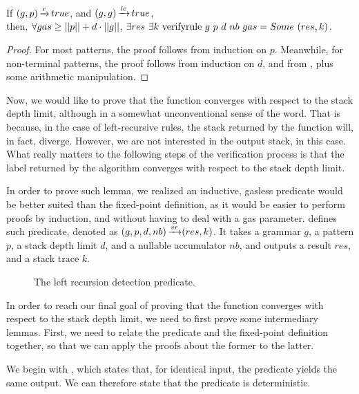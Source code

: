 \begin{lemma}%
    If $(g,p) \operatorname{\xrightarrow{\mathit{c}}} true$,
    and $(g,g) \operatorname{\xrightarrow{\mathit{lc}}} true$, \\
    then, $\forall gas \ge ||p|| + d \cdot ||g||$,
    $\exists res\ \exists k\ \verifyrulecomp{g}{p}{d}{nb}{gas} = \Some (res, k)$.
    \label{lemma:vr-termination}
\end{lemma}

\begin{proof}
    For most patterns,
    the proof follows from induction on $p$.
    Meanwhile, for non-terminal patterns,
    the proof follows from induction on $d$,
    and from ,
    plus some arithmetic manipulation.
\end{proof}

Now, we would like to
prove that the function
converges with respect to the
stack depth limit,
although in a somewhat unconventional
sense of the word.
That is because,
in the case of left-recursive rules,
the stack returned by the function will,
in fact,
diverge.
However, we are not interested in
the output stack, in this case.
What really matters to the following
steps of the verification process
is that the label returned by the algorithm converges
with respect to the stack depth limit.

In order to prove such lemma,
we realized an inductive, gasless predicate
would be better suited
than the fixed-point definition,
as it would be easier to perform proofs by induction,
and without having to deal with a gas parameter.
defines such predicate,
denoted as $(g,p,d,nb) \operatorname{\xrightarrow{\mathit{vr}}} (res,k)$.
It takes a grammar $g$,
a pattern $p$,
a stack depth limit $d$,
and a nullable accumulator $nb$,
and outputs a result $res$,
and a stack trace $k$.

\begin{figure}
    
    \caption{The left recursion detection predicate.}
    \label{fig:verifyrule}
\end{figure}

In order to reach our final goal
of proving that the function converges
with respect to the stack depth limit,
we need to first prove some intermediary lemmas.
First, we need to relate the predicate and
the fixed-point definition together,
so that we can apply the proofs about the
former to the latter.

We begin with
,
which states that,
for identical input,
the predicate yields the same output.
We can therefore state
that the predicate is deterministic.

